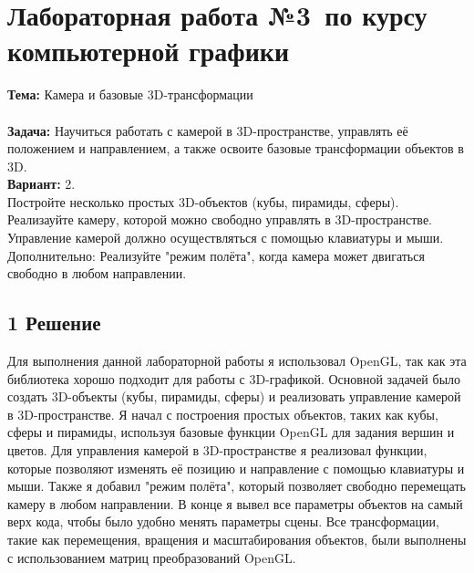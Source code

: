 \documentclass[12pt]{article}
\begin{document}




\section*{Лабораторная работа №3\, по курсу компьютерной графики}

\textbf{Тема:} Камера и базовые 3D-трансформации\\
\\
\textbf{Задача:} Научиться работать с камерой в 3D-пространстве, управлять её положением и направлением, а также освоите базовые трансформации объектов в 3D.\\
\textbf{Вариант:} 2.\\
Постройте несколько простых 3D-объектов (кубы, пирамиды, сферы).\\
Реализауйте камеру, которой можно свободно управлять в 3D-пространстве.
Управление камерой должно осуществляться с помощью клавиатуры и мыши.
Дополнительно: Реализуйте "режим полёта", когда камера может двигаться свободно в любом направлении.

\subsection*{1 Решение}
Для выполнения данной лабораторной работы я использовал OpenGL, так как эта библиотека хорошо подходит для работы с 3D-графикой. 
Основной задачей было создать 3D-объекты (кубы, пирамиды, сферы) и реализовать управление камерой в 3D-пространстве.
Я начал с построения простых объектов, таких как кубы, сферы и пирамиды, используя базовые функции OpenGL для задания вершин и цветов. 
Для управления камерой в 3D-пространстве я реализовал функции, которые позволяют изменять её позицию и направление с помощью клавиатуры и мыши. 
Также я добавил "режим полёта", который позволяет свободно перемещать камеру в любом направлении.
В конце я вывел все параметры объектов на самый верх кода, чтобы было удобно менять параметры сцены.
Все трансформации, такие как перемещения, вращения и масштабирования объектов, были выполнены с использованием матриц преобразований OpenGL.
\end{document}
